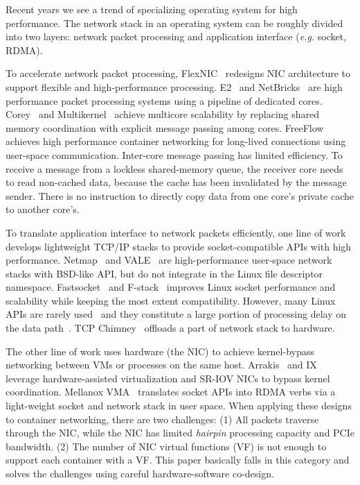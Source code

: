
Recent years we see a trend of specializing operating system for high performance.
The network stack in an operating system can be roughly divided into two layers: network packet processing and application interface (\textit{e.g.} socket, RDMA).

To accelerate network packet processing,
FlexNIC~\cite{kaufmann2015flexnic} redesigns NIC architecture to support flexible and high-performance processing.
E2~\cite{palkar2015e2} and NetBricks~\cite{panda2016netbricks} are high performance packet processing systems using a pipeline of dedicated cores.
Corey~\cite{boyd2008corey} and Multikernel~\cite{baumann2009multikernel} achieve multicore scalability by replacing shared memory coordination with explicit message passing among cores.
FreeFlow~\cite{freeflow} achieves high performance container networking for long-lived connections using user-space communication.
Inter-core message passing has limited efficiency. To receive a message from a lockless shared-memory queue, the receiver core needs to read non-cached data, because the cache has been invalidated by the message sender. There is no instruction to directly copy data from one core's private cache to another core's.

To translate application interface to network packets efficiently, one line of work develops lightweight TCP/IP stacks to provide socket-compatible APIs with high performance.
Netmap~\cite{rizzo2012netmap} and VALE~\cite{rizzo2012vale} are high-performance user-space network stacks with BSD-like API, but do not integrate in the Linux file descriptor namespace.
Fastsocket~\cite{lin2016scalable} and F-stack~\cite{fstack} improves Linux socket performance and scalability while keeping the most extent compatibility.
However, many Linux APIs are rarely used~\cite{tsai2016study} and they constitute a large portion of processing delay on the data path~\cite{peter2016arrakis}.
TCP Chimney~\cite{networking2004network} offloads a part of network stack to hardware.

The other line of work uses hardware (the NIC) to achieve kernel-bypass networking between VMs or processes on the same host.
Arrakis~\cite{peter2016arrakis} and IX~\cite{belay2017ix} leverage hardware-assisted virtualization and SR-IOV NICs to bypass kernel coordination.
Mellanox VMA~\cite{libvma} translates socket APIs into RDMA verbs via a light-weight socket and network stack in user space.
When applying these designs to container networking, there are two challenges: (1) All packets traverse through the NIC, while the NIC has limited \textit{hairpin} processing capacity and PCIe bandwidth. (2) The number of NIC virtual functions (VF) is not enough to support each container with a VF.
This paper basically falls in this category and solves the challenges using careful hardware-software co-design.

